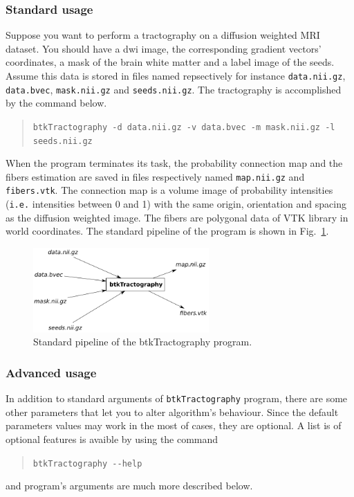     \subsubsection*{Standard usage}
        Suppose you want to perform a tractography on a diffusion weighted MRI dataset. You should have a dwi image, the corresponding gradient vectors' coordinates, a mask of the brain white matter and a label image of the seeds. Assume this data is stored in files named repsectively for instance \texttt{data.nii.gz}, \texttt{data.bvec}, \texttt{mask.nii.gz} and \texttt{seeds.nii.gz}. The tractography is accomplished by the command below.
            \begin{quote}
                \texttt{btkTractography -d data.nii.gz -v data.bvec -m mask.nii.gz -l seeds.nii.gz}
            \end{quote}
        When the program terminates its task, the probability connection map and the fibers estimation are saved in files respectively named \texttt{map.nii.gz} and \texttt{fibers.vtk}. The connection map is a volume image of probability intensities (\texttt{i.e.} intensities between 0 and 1) with the same origin, orientation and spacing as the diffusion weighted image. The fibers are polygonal data of VTK library in world coordinates. The standard pipeline of the program is shown in Fig.~\ref{btkTractography-fig:standard-pipeline}.
            \begin{figure}
                \centering
                \includegraphics[width=0.6\textwidth]{btkTractographyPipeline}
                \caption{Standard pipeline of the btkTractography program.}
                \label{btkTractography-fig:standard-pipeline}
            \end{figure}

    \subsubsection*{Advanced usage}
        In addition to standard arguments of \texttt{btkTractography} program, there are some other parameters that let you to alter algorithm's behaviour. Since the default parameters values may work in the most of cases, they are optional. A list is of optional features is avaible by using the command
            \begin{quote}
                \texttt{btkTractography -\hspace{0.1mm}-help}
            \end{quote}
        and program's arguments are much more described below.

